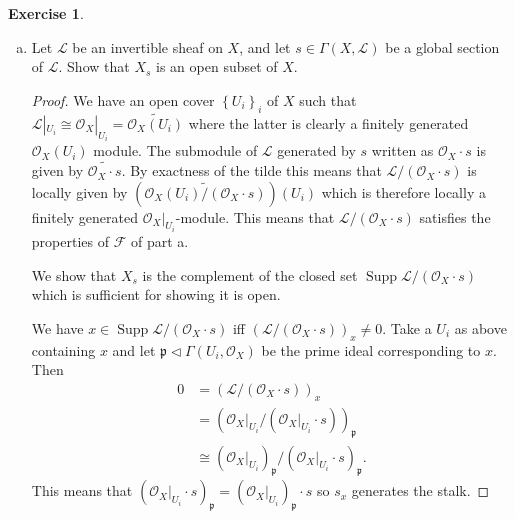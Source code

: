 \documentclass{article}
\newcommand{\sheaf}{\mathcal{O}}
\newcommand{\primeid}{\mathfrak{p}}
\newcommand{\set}[1]{\left\{#1\right\}}
\DeclareMathOperator{\supp}{Supp}
\newcommand{\ideal}{\triangleleft}
\theoremstyle{definition}
\newtheorem{question}{Exercise}
\begin{document}
\begin{question}
\begin{enumerate}[(a)]
        \item Let \(\mathcal{L}\) be an invertible sheaf on \(X\), and let
              \(s\in\Gamma(X,\mathcal{L})\) be a global section of
              \(\mathcal{L}\). Show that \(X_{s}\) is an open subset of \(X\).

              \begin{proof}
                  We have an open cover \(\set{U_{i}}_{i}\) of \(X\) such that
                  \(\mathcal{L}|_{U_{i}}\cong\sheaf_{X}|_{U_{i}}=\widetilde{\sheaf_{X}(U_{i})}\)
                  where the latter is clearly a finitely generated
                  \(\sheaf_{X}(U_{i})\) module. The submodule of \(\mathcal{L}\)
                  generated by \(s\) written as \(\sheaf_{X}\cdot s\) is given
                  by \(\widetilde{\sheaf_{X}\cdot s}\). By exactness of the
                  tilde this means that \(\mathcal{L}/(\sheaf_{X}\cdot s)\) is
                  locally given by
                  \((\widetilde{\sheaf_{X}(U_{i})/(\sheaf_{X}\cdot s)})(U_{i})\)
                  which is therefore locally a finitely generated
                  \(\sheaf_{X}|_{U_{i}}\)-module. This means that
                  \(\mathcal{L}/(\sheaf_{X}\cdot s)\) satisfies the properties
                  of \(\mathcal{F}\) of part a.

                  We show that \(X_{s}\) is the complement of the closed set
                  \(\supp\mathcal{L}/(\sheaf_{X}\cdot s)\) which is sufficient
                  for showing it is open.

                  We have \(x\in\supp\mathcal{L}/(\sheaf_{X}\cdot s)\) iff
                  \((\mathcal{L}/(\sheaf_{X}\cdot s))_{x}\neq0\). Take a
                  \(U_{i}\) as above containing \(x\) and let
                  \(\primeid\ideal\Gamma(U_{i},\sheaf_{X})\) be the prime ideal
                  corresponding to \(x\). Then
                  \begin{align*}
                      0 & =(\mathcal{L}/(\sheaf_{X}\cdot s))_{x}                                       \\
                        & =(\sheaf_{X}|_{U_{i}}/(\sheaf_{X}|_{U_{i}}\cdot s))_\primeid                 \\
                        & \cong(\sheaf_{X}|_{U_{i}})_{\primeid}/(\sheaf_{X}|_{U_{i}}\cdot s)_\primeid.
                  \end{align*}
                  This means that \((\sheaf_{X}|_{U_{i}}\cdot
                  s)_\primeid=(\sheaf_{X}|_{U_{i}})_{\primeid}\cdot s\) so \(s_{x}\)
                  generates the stalk.


\end{proof}
\end{enumerate}
\end{question}
\end{document}
